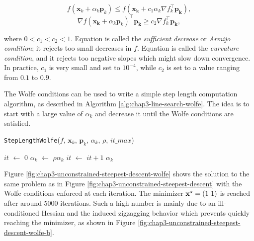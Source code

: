 \begin{equation}
\label{eq:chap3-wolfe-1}
f(\mathbf{x}_k + \alpha_k\mathbf{p}_k) \le
f(\mathbf{x_k}+c_1\alpha_k\nabla f_k^{\top}\mathbf{p_k}),
\end{equation}
\begin{equation}
\label{eq:chap3-wolfe-2}
\nabla f(\mathbf{x_k} + \alpha_k
\mathbf{p}_k)^{\top}\mathbf{p_k} \ge c_2 \nabla f_k^{\top}\mathbf{p_k},
\end{equation}

where $0 < c_1 < c_2 < 1$. Equation  is called
the \emph{sufficient decrease} or \emph {Armijo condition}; it rejects
too small decreases in $f$. Equation  is called
the \emph{curvature condition}, and it rejects too negative slopes
which might slow down convergence. In practice, $c_1$ is very small
and set to $10^{-4}$, while $c_2$ is set to a value ranging from $0.1$
to $0.9$.

The Wolfe conditions can be used to write a simple step length
computation algorithm, as described in Algorithm
\ref{alg:chap3-line-search-wolfe}. The idea is to start with a large
value of $\alpha_k$ and decrease it until the Wolfe conditions are
satisfied.

\begin{algorithm}
\caption{\texttt{StepLengthWolfe}($f$, $\mathbf{x}_k$, $\mathbf{p}_k$,
  $\alpha_k$, $\rho$, $it\_max$)}
\label{alg:chap3-line-search-wolfe}
\begin{algorithmic}
\STATE $it$ $\leftarrow$ $0$
\STATE $\alpha_k$ $\leftarrow$ $\rho \alpha_k$ 
\STATE $it$ $\leftarrow$ $it + 1$
\ENDWHILE
\RETURN $\alpha_k$
\end{algorithmic}
\end{algorithm}

Figure \ref{fig:chap3-unconstrained-steepest-descent-wolfe} shows the
solution to the same problem as in Figure
\ref{fig:chap3-unconstrained-steepest-descent} with the Wolfe
conditions enforced at each iteration. The minimizer
$\mathbf{x}^{\star}=(1~1)$ is reached after around 5000 iterations. Such a
high number is mainly due to an ill-conditioned Hessian and the
induced zigzagging behavior which prevents quickly reaching the
minimizer, as shown in Figure
\ref{fig:chap3-unconstrained-steepest-descent-wolfe-b}.

